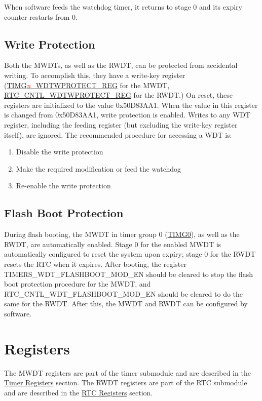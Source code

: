\documentclass[main\_\_EN.tex]{subfiles}
\begin{document}
When software feeds the watchdog timer, it returns to stage 0 and its expiry counter restarts from 0.

\subsection{Write Protection}
Both the MWDTs, as well as the RWDT, can be protected from accidental writing. To accomplish this, they have a write-key register (\hyperref[regdesc:TIMERSWDTWPROTECTREG]{TIMG\textcolor{red}{\it{n}}\_WDTWPROTECT\_REG} for the MWDT, \hyperref[regdesc:RTCCNTLWDTWPROTECTREG]{RTC\_CNTL\_WDTWPROTECT\_REG} for the RWDT.) On reset, these registers are initialized to the value 0x50D83AA1. When the value in this register is changed from 0x50D83AA1, write protection is enabled. Writes to any WDT register, including the feeding register (but excluding the write-key register itself), are ignored. The recommended procedure for accessing a WDT is:
\begin{enumerate}
\item Disable the write protection
\item Make the required modification or feed the watchdog
\item Re-enable the write protection
\end{enumerate}

\subsection{Flash Boot Protection}
During flash booting, the MWDT in timer group 0 (\hyperref[TIMG0]{TIMG0}), as well as the RWDT, are automatically enabled. Stage 0  for the enabled MWDT is automatically configured to reset the system upon expiry; stage 0 for the RWDT resets the RTC when it expires. After booting, the register TIMERS\_WDT\_FLASHBOOT\_MOD\_EN should be cleared to stop the flash boot protection procedure for the MWDT, and RTC\_CNTL\_WDT\_FLASHBOOT\_MOD\_EN should be cleared to do the same for the RWDT. After this, the MWDT and RWDT can be configured by software.

\section{Registers}
The MWDT registers are part of the timer submodule and are described in the \hyperref[timer_registers]{Timer Registers} section. The RWDT registers are part of the RTC submodule and are described in the \hyperref[register summary-chapter 30]{RTC Registers} section.
\end{document}
